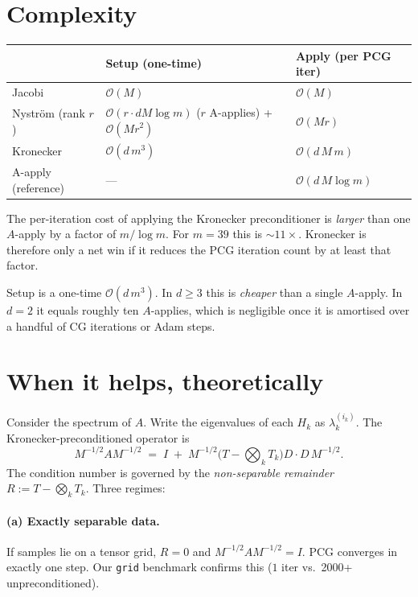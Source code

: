 \documentclass[11pt]{article}
\newcommand{\bigo}{\mathcal{O}}
\begin{document}
\section{Complexity}

\begin{center}
\begin{tabular}{lll}
\toprule
& \textbf{Setup (one-time)} & \textbf{Apply (per PCG iter)} \\
\midrule
Jacobi             & $\bigo(M)$                & $\bigo(M)$                   \\
Nystr\"{o}m (rank $r$) & $\bigo(r \cdot d M\log m)$ ($r$ A-applies) + $\bigo(Mr^2)$ & $\bigo(M r)$                 \\
Kronecker          & $\bigo(d\, m^3)$          & $\bigo(d\, M\, m)$           \\
A-apply (reference) & ---                       & $\bigo(d\, M\log m)$         \\
\bottomrule
\end{tabular}
\end{center}

The per-iteration cost of applying the Kronecker preconditioner is
\emph{larger} than one $A$-apply by a factor of $m/\log m$. For $m=39$
this is $\sim\!11\times$. Kronecker is therefore only a net win if it
reduces the PCG iteration count by at least that factor.

Setup is a one-time $\bigo(d\, m^3)$. In $d\geq 3$ this is
\emph{cheaper} than a single $A$-apply. In $d=2$ it equals roughly ten
$A$-applies, which is negligible once it is amortised over a handful of
CG iterations or Adam steps.

\section{When it helps, theoretically}

Consider the spectrum of $A$. Write the eigenvalues of each
$H_k$ as $\lambda^{(i_k)}_k$. The Kronecker-preconditioned operator is
\[
  M^{-1/2} A M^{-1/2}
  \;=\; I
  \;+\; M^{-1/2}\bigl(T - \bigotimes_k T_k\bigr) D\cdot D\, M^{-1/2}.
\]
The condition number is governed by the \emph{non-separable remainder}
$R := T - \bigotimes_k T_k$. Three regimes:

\paragraph{(a) Exactly separable data.}
If samples lie on a tensor grid, $R = 0$ and $M^{-1/2} A M^{-1/2} = I$.
PCG converges in exactly one step. Our \texttt{grid} benchmark confirms
this ($1$ iter vs.\ 2000+ unpreconditioned).
\end{document}
